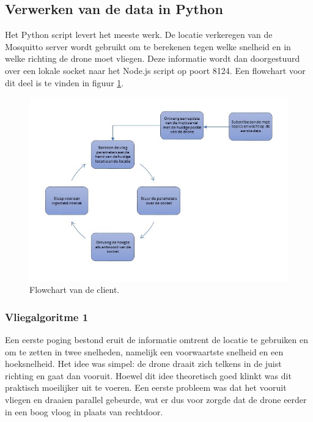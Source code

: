 \subsection{Verwerken van de data in Python}
Het Python script levert het meeste werk.
De locatie verkeregen van de Mosquitto server wordt gebruikt om te berekenen tegen welke snelheid en in welke richting de drone moet vliegen.
Deze informatie wordt dan doorgestuurd over een lokale socket naar het Node.js script op poort 8124.
Een flowchart voor dit deel is te vinden in figuur \ref{fig:flowchart_client}.
\begin{figure}[p]
	\centering
	\includegraphics[width=\textwidth]{images/python_client_flowchart}
	\caption[Flowchart van de client]{Flowchart van de client.}
	\label{fig:flowchart_client}
\end{figure}

\subsubsection{Vliegalgoritme 1}
Een eerste poging bestond eruit de informatie omtrent de locatie te gebruiken en om te zetten in twee snelheden, namelijk een voorwaartste snelheid en een hoeksnelheid.
Het idee was simpel: de drone draait zich telkens in de juist richting en gaat dan vooruit.
Hoewel dit idee theoretisch goed klinkt was dit praktisch moeilijker uit te voeren.
Een eerste probleem was dat het vooruit vliegen en draaien parallel gebeurde, wat er dus voor zorgde dat de drone eerder in een boog vloog in plaats van rechtdoor.

